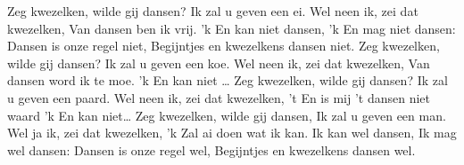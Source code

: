 \beginverse*
Zeg kwezelken, wilde gij dansen?
Ik zal u geven een ei.
Wel neen ik, zei dat kwezelken,
Van dansen ben ik vrij.
'k En kan niet dansen,
'k En mag niet dansen:
Dansen is onze regel niet,
Begijntjes en kwezelkens dansen niet.
\endverse
\beginverse*
Zeg kwezelken, wilde gij dansen?
Ik zal u geven een koe.
Wel neen ik, zei dat kwezelken,
Van dansen word ik te moe.
'k En kan niet …
\endverse
\beginverse*
Zeg kwezelken, wilde gij
dansen?
Ik zal u geven een paard.
Wel neen ik, zei dat kwezelken,
't En is mij 't dansen niet waard
'k En kan niet…
\endverse
\beginverse*
Zeg kwezelken, wilde gij dansen,
Ik zal u geven een man.
Wel ja ik, zei dat kwezelken,
'k Zal ai doen wat ik kan.
Ik kan wel dansen,
Ik mag wel dansen:
Dansen is onze regel wel,
Begijntjes en kwezelkens dansen wel.
\endverse
\endsong